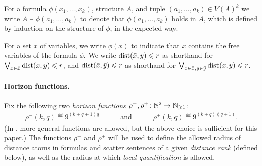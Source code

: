For a \distFO formula $\phi(x_1,\ldots,x_k)$, structure $A$, %
and  tuple $(a_1,\ldots,a_k)\in V(A)^k$
we write $A\models\phi(a_1,\ldots,a_k)$
to denote
that $\phi(a_1,\ldots,a_k)$ holds in $A$, which is defined by induction on the structure of $\phi$, in the expected way.

For a set $\bar x$ of variables, 
we write $\phi(\bar x)$ to indicate that $\bar x$ contains the free variables of the formula $\phi$.
We write \(\mathrm{dist}(\bar x,y) \leqslant r\) as shorthand for \(\bigvee_{x \in \bar x}\mathrm{dist}(x,y) \leqslant r\), and
\(\mathrm{dist}(\bar x,\bar y) \leqslant r\) as shorthand for
\(\bigvee_{x\in \bar x, y \in \bar y}\mathrm{dist}(x,y) \leqslant r\).






\paragraph{Horizon functions.}
Fix the following two \emph{horizon functions} $\rho^-,\rho^+\colon \mathbb N^2\to \mathbb N_{\geqslant 1}$:
\begin{align*}%
   \rho^-(k,q) \eqdef 9^{(k+q+1)q} \quad\quad\quad\text{and}\quad\quad\quad
   \rho^+(k,q) \eqdef 9^{(k+q)(q+1)}.
\end{align*}
(In \cite{locality-note}, more general functions are allowed, but the above choice is sufficient for this paper.)
The functions \(\rho^-\) and \(\rho^+\) will be used to define the allowed radius of distance atoms in \distFO formulas and scatter sentences of a given \emph{distance rank} (defined below), as well as the radius at which \emph{local quantification} is allowed.

